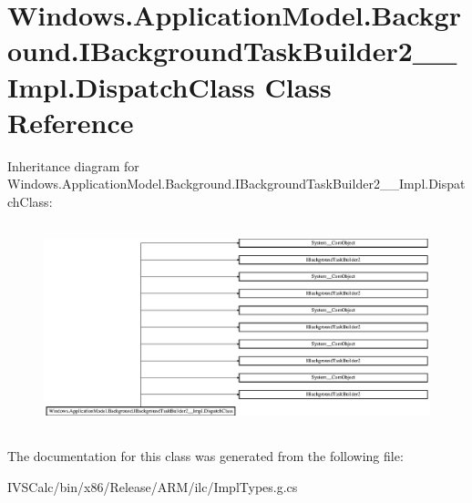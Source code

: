\hypertarget{class_windows_1_1_application_model_1_1_background_1_1_i_background_task_builder2_____impl_1_1_dispatch_class}{}\section{Windows.\+Application\+Model.\+Background.\+I\+Background\+Task\+Builder2\+\_\+\+\_\+\+Impl.\+Dispatch\+Class Class Reference}
\label{class_windows_1_1_application_model_1_1_background_1_1_i_background_task_builder2_____impl_1_1_dispatch_class}
Inheritance diagram for Windows.\+Application\+Model.\+Background.\+I\+Background\+Task\+Builder2\+\_\+\+\_\+\+Impl.\+Dispatch\+Class\+:\begin{figure}[H]
\begin{center}
\leavevmode
\includegraphics[height=6.015625cm]{class_windows_1_1_application_model_1_1_background_1_1_i_background_task_builder2_____impl_1_1_dispatch_class}
\end{center}
\end{figure}


The documentation for this class was generated from the following file\+:\begin{DoxyCompactItemize}
\item 
I\+V\+S\+Calc/bin/x86/\+Release/\+A\+R\+M/ilc/Impl\+Types.\+g.\+cs\end{DoxyCompactItemize}
